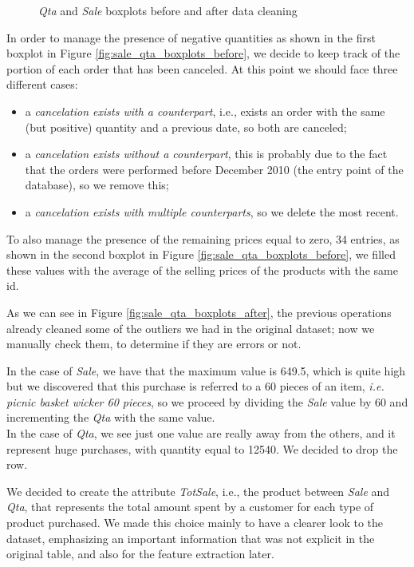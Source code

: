 \begin{figure}
\begin{subfigure}{.32\textwidth}
\caption{}
\label{fig:sale_qta_boxplots_after2}
\end{subfigure}
\caption{\emph{Qta} and \emph{Sale} boxplots before and after data cleaning}
\end{figure}

In order to manage the presence of negative quantities as shown in the first boxplot in Figure \ref{fig:sale_qta_boxplots_before}, we decide to keep track of the portion of each order that has been canceled. At this point we should face three different cases:

\begin{itemize}
\item a \emph{cancelation exists with a counterpart}, i.e., exists an order with the same (but positive) quantity and a previous date, so both are canceled;
\item a \emph{cancelation exists without a counterpart}, this is probably due to the fact that the orders were performed before December 2010 (the entry point of the database), so we remove this;
\item a \emph{cancelation exists with multiple counterparts}, so we delete the most recent.
\end{itemize}

To also manage the presence of the remaining prices equal to zero, 34 entries, as shown in the second boxplot in Figure \ref{fig:sale_qta_boxplots_before}, we filled these values with the average of the selling prices of the products with the same id.

As we can see in Figure \ref{fig:sale_qta_boxplots_after}, the previous operations already cleaned some of the outliers we had in the original dataset; now we manually check them, to determine if they are errors or not.

In the case of \emph{Sale}, we have that the maximum value is 649.5, which is quite high but we discovered that this purchase is referred to a 60 pieces of an item, \emph{i.e. picnic basket wicker 60 pieces}, so we proceed by dividing the \emph{Sale} value by 60 and incrementing the \emph{Qta} with the same value.\\
In the case of \emph{Qta}, we see just one value are really away from the others, and it represent huge purchases, with quantity equal to 12540. We decided to drop the row.

We decided to create the attribute \emph{TotSale}, i.e., the product between \emph{Sale} and \emph{Qta}, that represents the total amount spent by a customer for each type of product purchased. We made this choice mainly to have a clearer look to the dataset, emphasizing an important information that was not explicit in the original table, and also for the feature extraction later.

